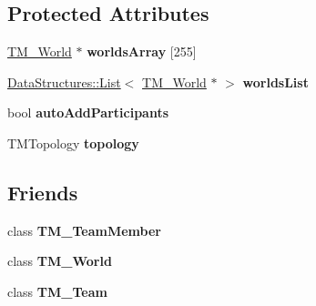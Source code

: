 \subsection*{Protected Attributes}
\begin{DoxyCompactItemize}
\item 
\hypertarget{class_rak_net_1_1_team_manager_a6fa369e977b8046e9c4183f475a94af8}{\hyperlink{class_rak_net_1_1_t_m___world}{T\-M\-\_\-\-World} $\ast$ {\bfseries worlds\-Array} \mbox{[}255\mbox{]}}\label{class_rak_net_1_1_team_manager_a6fa369e977b8046e9c4183f475a94af8}

\item 
\hypertarget{class_rak_net_1_1_team_manager_a8bdea98be90e71bb97c47944ce187e68}{\hyperlink{class_data_structures_1_1_list}{Data\-Structures\-::\-List}$<$ \hyperlink{class_rak_net_1_1_t_m___world}{T\-M\-\_\-\-World} $\ast$ $>$ {\bfseries worlds\-List}}\label{class_rak_net_1_1_team_manager_a8bdea98be90e71bb97c47944ce187e68}

\item 
\hypertarget{class_rak_net_1_1_team_manager_ab7404c26fa1b914257867befbbf52278}{bool {\bfseries auto\-Add\-Participants}}\label{class_rak_net_1_1_team_manager_ab7404c26fa1b914257867befbbf52278}

\item 
\hypertarget{class_rak_net_1_1_team_manager_a9f36a299e74e1bb956f5d62f6ae85baa}{T\-M\-Topology {\bfseries topology}}\label{class_rak_net_1_1_team_manager_a9f36a299e74e1bb956f5d62f6ae85baa}

\end{DoxyCompactItemize}
\subsection*{Friends}
\begin{DoxyCompactItemize}
\item 
\hypertarget{class_rak_net_1_1_team_manager_a11ad3f6dfe86143c6914f3aae4e553a7}{class {\bfseries T\-M\-\_\-\-Team\-Member}}\label{class_rak_net_1_1_team_manager_a11ad3f6dfe86143c6914f3aae4e553a7}

\item 
\hypertarget{class_rak_net_1_1_team_manager_a1c849d724e23da543213088c6bc98353}{class {\bfseries T\-M\-\_\-\-World}}\label{class_rak_net_1_1_team_manager_a1c849d724e23da543213088c6bc98353}

\item 
\hypertarget{class_rak_net_1_1_team_manager_aca9b5a67242d34d0d5f8ceac750051f9}{class {\bfseries T\-M\-\_\-\-Team}}\label{class_rak_net_1_1_team_manager_aca9b5a67242d34d0d5f8ceac750051f9}

\end{DoxyCompactItemize}



